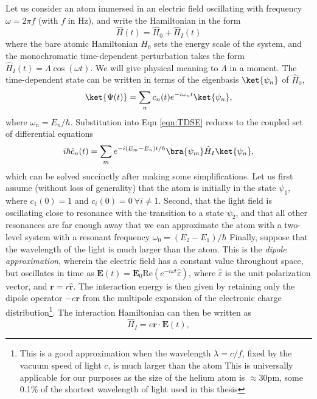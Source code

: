 	Let us consider an atom immersed in an electric field oscillating with frequency $\omega = 2 \pi f$ (with $f$ in Hz), and write the Hamiltonian in the form
	\begin{equation}
		\hat{H}(t) = \hat{H}_0 + \hat{H}_{I}(t)
	\end{equation}
	where the bare atomic Hamiltonian $H_0$ sets the energy scale of the system, and the monochromatic time-dependent perturbation takes the form $\hat{H}_I(t) = \Lambda \cos(\omega t)$.
	We will give physical meaning to $\Lambda$ in a moment.
	The time-dependent state can be written in terms of the eigenbasis $\ket{\psi_n}$ of $\hat{H}_0$,
	\begin{equation}
		\ket{\Psi(t)} = \sum_n c_n(t)e^{-i\omega_n t}\ket{\psi_n},
	\end{equation}
	where $\omega_n= E_n/\hbar$.
	Substitution into Eqn \ref{eqn:TDSE} reduces to the coupled set of differential equations 
	\begin{equation}
		i\hbar\dot{c}_n(t) = \sum_m e^{-i(E_m-E_n)t/\hbar}\bra{\psi_m}\hat{H}_I\ket{\psi_n},
	\end{equation} 
	which can be solved succinctly after making some simplifications.
	Let us first assume (without loss of generality) that the atom is initially in the state $\psi_1$, where $c_1(0)=1$ and $c_i(0)=0~\forall i\neq1$.
	Second, that the light field is oscillating close to resonance with the transition to a state $\psi_2$, and that all other resonances are far enough away that we can approximate the atom with a two-level system with a resonant frequency $\omega_0 =(E_2-E_1)/\hbar$
	Finally, suppose that the wavelength of the light is much larger than the atom. 
	This is the \emph{dipole approximation}, wherein the electric field has a constant value throughout space, but oscillates in time as $\textbf{E}(t) = \textbf{E}_0 \textrm{Re}(e^{-i\omega t}\hat{\varepsilon})$, where $\hat{\varepsilon}$ is the unit polarization vector, and $\textbf{r} = r\hat{\textbf{r}}$.
	The interaction energy is then given by retaining only the dipole operator $-e\textbf{r}$ from the multipole expansion of the electronic charge distribution\footnote{This is a good approximation when the wavelength $\lambda = c/f$, fixed by the vacuum speed of light $c$, is much larger than the atom This is universally applicable for our purposes as the size of the helium atom is $\approx 30$pm, some 0.1\% of the shortest wavelength of light used in this thesis}.
	The interaction Hamiltonian can then be written as
	\begin{equation}
		\hat{H}_I = e\textbf{r}\cdot\textbf{E}(t),
	\end{equation}
